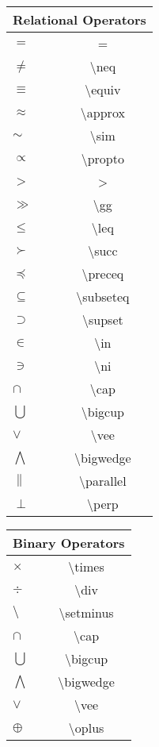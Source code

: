 \begin{multicols}{2}
	\begin{tabular}{|l|c|}
		\hline
		\multicolumn{2}{|c|}{Relational Operators} \\
		\hline
		$=$ & = \\
		$\neq$ & \textbackslash{}neq \\
		$\equiv$ & \textbackslash{}equiv \\
		$\approx$ & \textbackslash{}approx \\
		$\sim$ & \textbackslash{}sim \\
		$\propto$ & \textbackslash{}propto \\
		$>$ & > \\
		$\gg$ & \textbackslash{}gg \\
		$\leq$ & \textbackslash{}leq \\
		$\succ$ & \textbackslash{}succ \\
		$\preceq$ & \textbackslash{}preceq \\
		$\subseteq$ & \textbackslash{}subseteq \\
		$\supset$ & \textbackslash{}supset \\
		$\in$ & \textbackslash{}in \\
		$\ni$ & \textbackslash{}ni \\
		$\cap$ & \textbackslash{}cap \\
		$\bigcup$ & \textbackslash{}bigcup \\
		$\vee$ & \textbackslash{}vee \\
		$\bigwedge$ & \textbackslash{}bigwedge \\
		$\parallel$ & \textbackslash{}parallel \\
		$\perp$ & \textbackslash{}perp \\
		\hline
	\end{tabular}
	\begin{tabular}{|l|c|}
			\hline
		\multicolumn{2}{|c|}{Binary Operators} \\
			\hline
		$\times$ & \textbackslash{}times \\
		$\div$ & \textbackslash{}div \\
		$\setminus$ & \textbackslash{}setminus \\
		$\cap$ & \textbackslash{}cap \\
		$\bigcup$ & \textbackslash{}bigcup \\
		$\bigwedge$ & \textbackslash{}bigwedge \\
		$\vee$ & \textbackslash{}vee \\
		$\oplus$ & \textbackslash{}oplus \\

\end{tabular}
\end{multicols}
